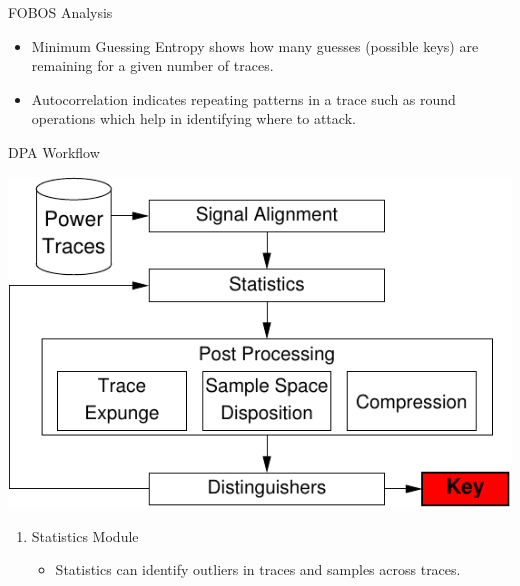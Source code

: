 \documentclass[xcolor=pdftex,dvipsnames,table,final]{beamer}
\begin{document}
\begin{frame}[fragile]{}
\begin{columns}[t]
\begin{column}{.31\linewidth}
       \begin{block}{FOBOS Analysis}
        \begin{minipage}{0.69\linewidth}
        \end{minipage}
	\hspace{-5ex}
	\begin{minipage}{0.31\linewidth}
          {\small
          \begin{itemize}
            \item Minimum Guessing Entropy shows how many guesses (possible keys) are 
                  remaining for a given number of traces. 
            \item Autocorrelation indicates repeating patterns in a trace such as round 
                  operations which help in identifying where to attack. 
          \end{itemize}
          }  
	\end{minipage} 
       \end{block}
       \begin{block}{DPA Workflow}
        \vspace{-1ex}
        \begin{center}
          \includegraphics[scale=1.5]{../figures/data_anl}
        \end{center} 
        \vspace{-1ex}
        \begin{enumerate}
          \item Statistics Module
          \begin{itemize}
            \item Statistics can identify outliers in traces and samples across traces.

\end{itemize}
\end{enumerate}
\end{block}
\end{column}
\end{columns}
\end{frame}
\end{document}
